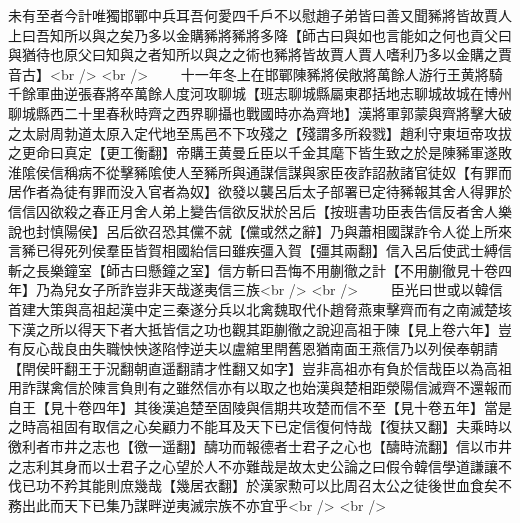 未有至者今計唯獨邯鄲中兵耳吾何愛四千戶不以慰趙子弟皆曰善又聞豨將皆故賈人上曰吾知所以與之矣乃多以金購豨將豨將多降【師古曰與如也言能如之何也貢父曰與猶待也原父曰知與之者知所以與之之術也豨將皆故賈人賈人嗜利乃多以金購之賈音古】<br />
<br />
　　十一年冬上在邯鄲陳豨將侯敞將萬餘人游行王黄將騎千餘軍曲逆張春將卒萬餘人度河攻聊城【班志聊城縣屬東郡括地志聊城故城在博州聊城縣西二十里春秋時齊之西界聊攝也戰國時亦為齊地】漢將軍郭蒙與齊將擊大破之太尉周勃道太原入定代地至馬邑不下攻殘之【殘謂多所殺戮】趙利守東垣帝攻拔之更命曰真定【更工衡翻】帝購王黄曼丘臣以千金其麾下皆生致之於是陳豨軍遂敗淮隂侯信稱病不從擊豨隂使人至豨所與通謀信謀與家臣夜詐詔赦諸官徒奴【有罪而居作者為徒有罪而没入官者為奴】欲發以襲呂后太子部署已定待豨報其舍人得罪於信信囚欲殺之春正月舍人弟上變告信欲反狀於呂后【按班書功臣表告信反者舍人樂說也封慎陽侯】呂后欲召恐其儻不就【儻或然之辭】乃與蕭相國謀詐令人從上所來言豨已得死列侯羣臣皆賀相國紿信曰雖疾彊入賀【彊其兩翻】信入呂后使武士縛信斬之長樂鐘室【師古曰懸鐘之室】信方斬曰吾悔不用蒯徹之計【不用蒯徹見十卷四年】乃為兒女子所詐豈非天哉遂夷信三族<br />
<br />
　　臣光曰世或以韓信首建大策與高祖起漢中定三秦遂分兵以北禽魏取代仆趙脅燕東擊齊而有之南滅楚垓下漢之所以得天下者大抵皆信之功也觀其距蒯徹之說迎高祖于陳【見上卷六年】豈有反心哉良由失職怏怏遂陷悖逆夫以盧綰里閈舊恩猶南面王燕信乃以列侯奉朝請【閈侯旰翻王于況翻朝直遥翻請才性翻又如字】豈非高祖亦有負於信哉臣以為高祖用詐謀禽信於陳言負則有之雖然信亦有以取之也始漢與楚相距滎陽信滅齊不還報而自王【見十卷四年】其後漢追楚至固陵與信期共攻楚而信不至【見十卷五年】當是之時高祖固有取信之心矣顧力不能耳及天下已定信復何恃哉【復扶又翻】夫乘時以徼利者市井之志也【徼一遥翻】醻功而報德者士君子之心也【醻時流翻】信以市井之志利其身而以士君子之心望於人不亦難哉是故太史公論之曰假令韓信學道謙讓不伐已功不矜其能則庶幾哉【幾居衣翻】於漢家勲可以比周召太公之徒後世血食矣不務出此而天下已集乃謀畔逆夷滅宗族不亦宜乎<br />
<br />

